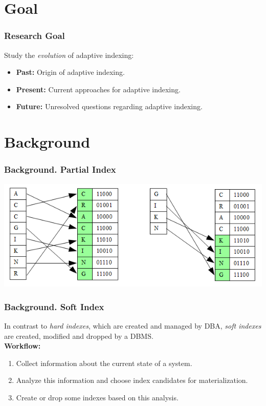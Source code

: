 \documentclass{beamer}
\begin{document}
\section{Goal}
\begin{frame}
\frametitle{Research Goal}
\pause
Study the \emph{evolution} of adaptive indexing: \pause
\begin{itemize}
\item{\textbf{Past:}} Origin of adaptive indexing. \pause
\item{\textbf{Present:}} Current approaches for adaptive indexing. \pause
\item{\textbf{Future:}} Unresolved questions regarding adaptive indexing.
\end{itemize}
\end{frame}

\section{Background}
\begin{frame}
\frametitle{Background. Partial Index}
\includegraphics[width=\textwidth]{graphics/partial.png}
\end{frame}

\begin{frame}
\frametitle{Background. Soft Index}
In contrast to \emph{hard indexes}, which are created and managed by DBA, \emph{soft indexes} are created, modified and dropped by a DBMS.\\ \pause
\vspace{0.5cm}\textbf{Workflow:} \pause
\begin{enumerate}
\item{Collect information about the current state of a system.} \pause
\item{Analyze this information and choose index candidates for  materialization.} \pause
\item{Create or drop some indexes based on this analysis.}
\end{enumerate}
\end{frame}
\end{document}
